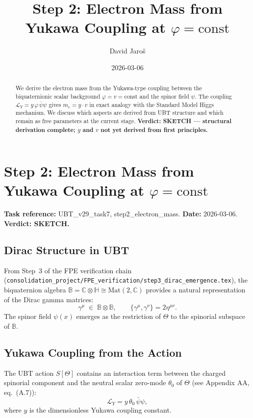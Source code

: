 \documentclass[12pt]{article}
\title{\textbf{Step 2: Electron Mass from Yukawa Coupling at $\varphi = \mathrm{const}$}}
\author{David Jaroš}
\date{2026-03-06}
\theoremstyle{definition}
\theoremstyle{remark}
\begin{document}
  \maketitle

  \begin{abstract}
  We derive the electron mass from the Yukawa-type coupling between the biquaternionic
  scalar background $\varphi = v = \mathrm{const}$ and the spinor field $\psi$.
  The coupling $\mathcal{L}_Y = y\,\varphi\,\bar\psi\psi$ gives $m_e = y\cdot v$ in exact
  analogy with the Standard Model Higgs mechanism.  We discuss which aspects are derived
  from UBT structure and which remain as free parameters at the current stage.
  \textbf{Verdict: SKETCH — structural derivation complete; $y$ and $v$ not yet derived
  from first principles.}
  \end{abstract}
\fi

\section{Step 2: Electron Mass from Yukawa Coupling at $\varphi = \mathrm{const}$}
\label{sec:electron_mass}

\textbf{Task reference:} UBT\_v29\_task7, step2\_electron\_mass.
\textbf{Date:} 2026-03-06.
\textbf{Verdict: SKETCH.}

\subsection{Dirac Structure in UBT}

From Step~3 of the FPE verification chain
(\texttt{consolidation\_project/FPE\_verification/step3\_dirac\_emergence.tex}),
the biquaternion algebra
$\mathbb{B} = \mathbb{C}\otimes\mathbb{H}\cong\mathrm{Mat}(2,\mathbb{C})$
provides a natural representation of the Dirac gamma matrices:
\begin{equation}
  \gamma^\mu \;\in\; \mathbb{B}\otimes\mathbb{B},
  \qquad \{\gamma^\mu,\gamma^\nu\} = 2\eta^{\mu\nu}.
\end{equation}
The spinor field $\psi(x)$ emerges as the restriction of $\Theta$ to the spinorial
subspace of $\mathbb{B}$.

\subsection{Yukawa Coupling from the Action}

The UBT action $S[\Theta]$ contains an interaction term between the charged spinorial
component and the neutral scalar zero-mode $\theta_0$ of $\Theta$ (see Appendix AA,
eq.~(A.7)):
\begin{equation}
  \mathcal{L}_Y = y\,\theta_0\,\bar\psi\psi,
\end{equation}
where $y$ is the dimensionless Yukawa coupling constant.
\end{document}
